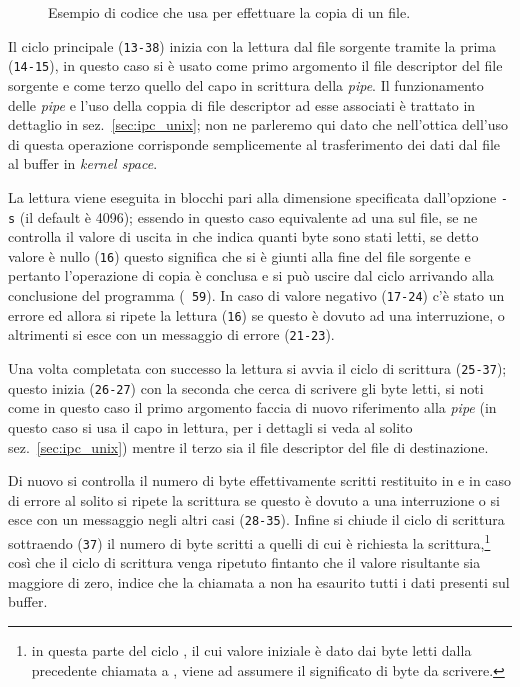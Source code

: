 \begin{figure}[!htb]
  \footnotesize \centering
  \begin{minipage}[c]{\codesamplewidth}
  \end{minipage}
  \normalsize
  \caption{Esempio di codice che usa  per effettuare la copia di
    un file.}
  \label{fig:splice_example}
\end{figure}

Il ciclo principale (\texttt{\small 13-38}) inizia con la lettura dal file
sorgente tramite la prima  (\texttt{\small 14-15}), in questo
caso si è usato come primo argomento il file descriptor del file sorgente e
come terzo quello del capo in scrittura della \textit{pipe}. Il funzionamento
delle \textit{pipe} e l'uso della coppia di file descriptor ad esse associati
è trattato in dettaglio in sez.~\ref{sec:ipc_unix}; non ne parleremo qui dato
che nell'ottica dell'uso di  questa operazione corrisponde
semplicemente al trasferimento dei dati dal file al buffer in \textit{kernel
  space}.

La lettura viene eseguita in blocchi pari alla dimensione specificata
dall'opzione \texttt{-s} (il default è 4096); essendo in questo caso
 equivalente ad una  sul file, se ne controlla il
valore di uscita in  che indica quanti byte sono stati letti, se
detto valore è nullo (\texttt{\small 16}) questo significa che si è giunti
alla fine del file sorgente e pertanto l'operazione di copia è conclusa e si
può uscire dal ciclo arrivando alla conclusione del programma (\texttt{\small
  59}). In caso di valore negativo (\texttt{\small 17-24}) c'è stato un
errore ed allora si ripete la lettura (\texttt{\small 16}) se questo è dovuto
ad una interruzione, o altrimenti si esce con un messaggio di errore
(\texttt{\small 21-23}).

Una volta completata con successo la lettura si avvia il ciclo di scrittura
(\texttt{\small 25-37}); questo inizia (\texttt{\small 26-27}) con la
seconda  che cerca di scrivere gli  byte letti, si
noti come in questo caso il primo argomento faccia di nuovo riferimento alla
\textit{pipe} (in questo caso si usa il capo in lettura, per i dettagli si
veda al solito sez.~\ref{sec:ipc_unix}) mentre il terzo sia il file descriptor
del file di destinazione.

Di nuovo si controlla il numero di byte effettivamente scritti restituito in
 e in caso di errore al solito si ripete la scrittura se questo è
dovuto a una interruzione o si esce con un messaggio negli altri casi
(\texttt{\small 28-35}). Infine si chiude il ciclo di scrittura sottraendo
(\texttt{\small 37}) il numero di byte scritti a quelli di cui è richiesta la
scrittura,\footnote{in questa parte del ciclo , il cui valore
  iniziale è dato dai byte letti dalla precedente chiamata a ,
  viene ad assumere il significato di byte da scrivere.} così che il ciclo di
scrittura venga ripetuto fintanto che il valore risultante sia maggiore di
zero, indice che la chiamata a  non ha esaurito tutti i dati
presenti sul buffer.

